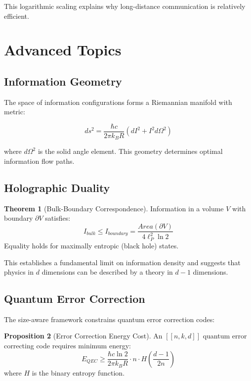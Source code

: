 \documentclass[11pt,a4paper]{article}
\theoremstyle{definition}
\newtheorem{theorem}{Theorem}[section]
\newtheorem{proposition}[theorem]{Proposition}
\begin{document}
This logarithmic scaling explains why long-distance communication is relatively efficient.

\section{Advanced Topics}

\subsection{Information Geometry}

The space of information configurations forms a Riemannian manifold with metric:

\begin{equation}
ds^2 = \frac{\hbar c}{2\pi k_B R} \left(dI^2 + I^2 d\Omega^2\right)
\end{equation}

where $d\Omega^2$ is the solid angle element. This geometry determines optimal information flow paths.

\subsection{Holographic Duality}

\begin{theorem}[Bulk-Boundary Correspondence]
Information in a volume $V$ with boundary $\partial V$ satisfies:
\begin{equation}
I_{bulk} \leq I_{boundary} = \frac{Area(\partial V)}{4\ell_P^2 \ln 2}
\end{equation}
Equality holds for maximally entropic (black hole) states.
\end{theorem}

This establishes a fundamental limit on information density and suggests that physics in $d$ dimensions can be described by a theory in $d-1$ dimensions.

\subsection{Quantum Error Correction}

The size-aware framework constrains quantum error correction codes:

\begin{proposition}[Error Correction Energy Cost]
An $[[n,k,d]]$ quantum error correcting code requires minimum energy:
\begin{equation}
E_{QEC} \geq \frac{\hbar c \ln 2}{2\pi k_B R} \cdot n \cdot H\left(\frac{d-1}{2n}\right)
\end{equation}
where $H$ is the binary entropy function.
\end{proposition}
\end{document}
